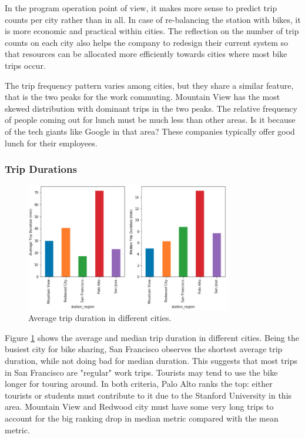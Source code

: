 \documentclass[a4paper]{article}
\begin{document}
			In the program operation point of view, it makes more sense to predict trip counts per city rather than in all. In case of re-balancing the station with bikes, it is more economic and practical within cities. The reflection on the number of trip counts on each city also helps the company to redesign their current system so that resources can be allocated more efficiently towards cities where most bike trips occur.
			
			The trip frequency pattern varies among cities, but they share a similar feature, that is the two peaks for the work commuting. Mountain View has the most skewed distribution with dominant trips in the two peaks. The relative frequency of people coming out for lunch must be much less than other areas. Is it because of the tech giants like Google in that area? These companies typically offer good lunch for their employees.
				
			\subsubsection{Trip Durations}
			
			\begin{figure}
				\centering
				\includegraphics[width=0.8\textwidth]{BikeDuration.png}
				\caption{\label{fig:bike_duration}Average trip duration in different cities.}
			\end{figure}	
			
			Figure \ref{fig:bike_duration} shows the average and median trip duration in different cities. Being the busiest city for bike sharing, San Francisco observes the shortest average trip duration, while not doing bad for median duration. This suggests that most trips in San Francisco are "regular" work trips. Tourists may tend to use the bike longer for touring around. In both criteria, Palo Alto ranks the top: either tourists or students must contribute to it due to the Stanford University in this area. Mountain View and Redwood city must have some very long trips to account for the big ranking drop in median metric compared with the mean metric.
			
\end{document}
